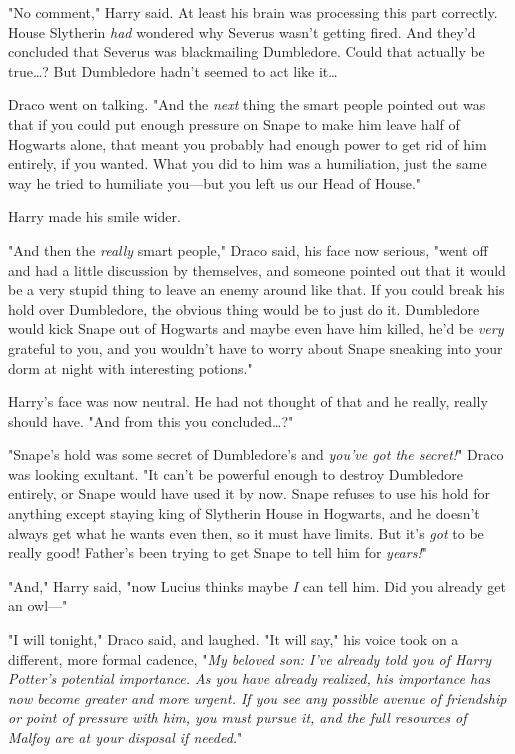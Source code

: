 "No comment," Harry said. At least his brain was processing this part
correctly. House Slytherin \emph{had} wondered why Severus wasn't getting
fired. And they'd concluded that Severus was blackmailing Dumbledore. Could
that actually be true{\ldots}? But Dumbledore hadn't seemed to act like
it{\ldots}

Draco went on talking. "And the \emph{next} thing the smart people pointed out
was that if you could put enough pressure on Snape to make him leave half of
Hogwarts alone, that meant you probably had enough power to get rid of him
entirely, if you wanted. What you did to him was a humiliation, just the same
way he tried to humiliate you---but you left us our Head of House."

Harry made his smile wider.

"And then the \emph{really} smart people," Draco said, his face now serious,
"went off and had a little discussion by themselves, and someone pointed out
that it would be a very stupid thing to leave an enemy around like that. If you
could break his hold over Dumbledore, the obvious thing would be to just do it.
Dumbledore would kick Snape out of Hogwarts and maybe even have him killed,
he'd be \emph{very} grateful to you, and you wouldn't have to worry about Snape
sneaking into your dorm at night with interesting potions."

Harry's face was now neutral. He had not thought of that and he really, really
should have. "And from this you concluded{\ldots}?"

"Snape's hold was some secret of Dumbledore's and \emph{you've got the
secret!}" Draco was looking exultant. "It can't be powerful enough to destroy
Dumbledore entirely, or Snape would have used it by now. Snape refuses to use
his hold for anything except staying king of Slytherin House in Hogwarts, and
he doesn't always get what he wants even then, so it must have limits. But it's
\emph{got} to be really good! Father's been trying to get Snape to tell him for
\emph{years!}"

"And," Harry said, "now Lucius thinks maybe \emph{I} can tell him. Did you
already get an owl---"

"I will tonight," Draco said, and laughed. "It will say," his voice took on a
different, more formal cadence, "\emph{My beloved son: I've already told you of
Harry Potter's potential importance. As you have already realized, his
importance has now become greater and more urgent. If you see any possible
avenue of friendship or point of pressure with him, you must pursue it, and the
full resources of Malfoy are at your disposal if needed.}"

